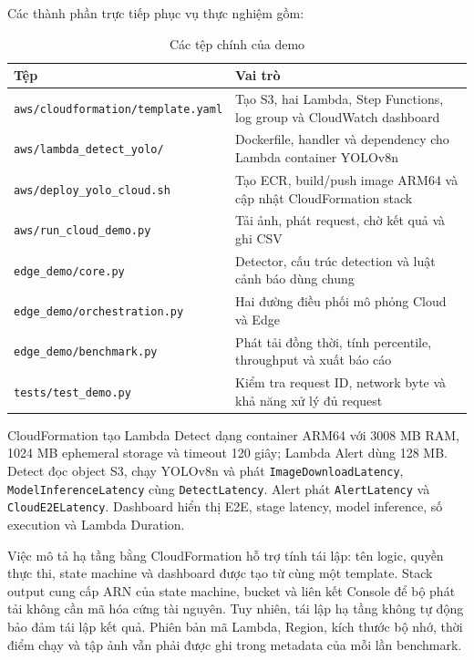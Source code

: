 Các thành phần trực tiếp phục vụ thực nghiệm gồm:

\begin{table}[htbp]
    \centering
    \caption{Các tệp chính của demo}
    \label{tab:repository-files}
    \begin{tabular}{|p{6cm}|p{8cm}|}
        \hline
        \textbf{Tệp} & \textbf{Vai trò} \\ \hline
        \texttt{aws/cloudformation/template.yaml} & Tạo S3, hai Lambda, Step
        Functions, log group và CloudWatch dashboard \\ \hline
        \texttt{aws/lambda\_detect\_yolo/} & Dockerfile, handler và dependency
        cho Lambda container YOLOv8n \\ \hline
        \texttt{aws/deploy\_yolo\_cloud.sh} & Tạo ECR, build/push image ARM64 và
        cập nhật CloudFormation stack \\ \hline
        \texttt{aws/run\_cloud\_demo.py} & Tải ảnh, phát request, chờ kết quả và
        ghi CSV \\ \hline
        \texttt{edge\_demo/core.py} & Detector, cấu trúc detection và luật cảnh
        báo dùng chung \\ \hline
        \texttt{edge\_demo/orchestration.py} & Hai đường điều phối mô phỏng Cloud
        và Edge \\ \hline
        \texttt{edge\_demo/benchmark.py} & Phát tải đồng thời, tính percentile,
        throughput và xuất báo cáo \\ \hline
        \texttt{tests/test\_demo.py} & Kiểm tra request ID, network byte và khả
        năng xử lý đủ request \\ \hline
    \end{tabular}
\end{table}

CloudFormation tạo Lambda Detect dạng container ARM64 với 3008 MB RAM, 1024 MB
ephemeral storage và timeout 120 giây; Lambda Alert dùng 128 MB. Detect đọc object
S3, chạy YOLOv8n và phát \texttt{ImageDownloadLatency},
\texttt{ModelInferenceLatency} cùng \texttt{DetectLatency}. Alert phát
\texttt{AlertLatency} và \texttt{CloudE2ELatency}. Dashboard hiển thị E2E,
stage latency, model inference, số execution và Lambda Duration.

Việc mô tả hạ tầng bằng CloudFormation hỗ trợ tính tái lập: tên logic, quyền thực
thi, state machine và dashboard được tạo từ cùng một template. Stack output cung
cấp ARN của state machine, bucket và liên kết Console để bộ phát tải không cần mã
hóa cứng tài nguyên. Tuy nhiên, tái lập hạ tầng không tự động bảo đảm tái lập kết
quả. Phiên bản mã Lambda, Region, kích thước bộ nhớ, thời điểm chạy và tập ảnh vẫn
phải được ghi trong metadata của mỗi lần benchmark.

